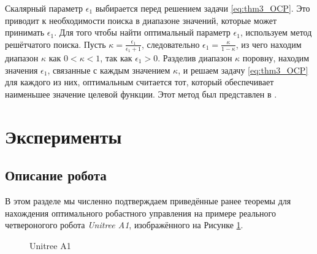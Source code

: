 Скалярный параметр $\epsilon_1$ выбирается перед решением задачи \eqref{eq:thm3_OCP}. Это приводит к необходимости поиска в диапазоне значений, которые может принимать $\epsilon_1$. Для того чтобы найти оптимальный параметр $\epsilon_1$, используем метод решётчатого поиска. Пусть $\kappa=\frac{\epsilon_1}{\epsilon_1+1}$, следовательно
$\epsilon_1=\frac{\kappa}{1-\kappa}$, из чего находим диапазон $\kappa$ как $0 < \kappa < 1$, так как $\epsilon_1 > 0$. Разделив диапазон $\kappa$ поровну, находим значения $\epsilon_1$, связанные с каждым значением $\kappa$, и решаем задачу \eqref{eq:thm3_OCP} для каждого из них, оптимальным считается тот, который обеспечивает наименьшее значение целевой функции. Этот метод был представлен в \cite{Li1997}.

\section{Эксперименты}\label{sec:ch3/sect3}
\subsection{Описание робота}\label{sec:ch3/sect3/sub1}
В этом разделе мы численно подтверждаем приведённые ранее теоремы для нахождения оптимального робастного управления на примере реального четвероногого робота \textit{Unitree A1}, изображённого на Рисунке \cref{fig:unitree}.
\begin{figure}[ht]
	\caption{Unitree A1}\label{fig:unitree}
\end{figure} 

